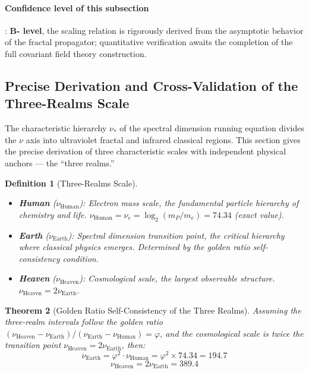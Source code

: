\documentclass[12pt,a4paper,twocolumn]{article}
\renewcommand{\phi}{\varphi}
\newtheorem{theorem}{Theorem}[section]
\newtheorem{definition}[theorem]{Definition}
\begin{document}
\paragraph{Confidence level of this subsection}: \textbf{B- level}, the scaling relation is rigorously derived from the asymptotic behavior of the fractal propagator; quantitative verification awaits the completion of the full covariant field theory construction.

\subsection{Precise Derivation and Cross-Validation of the Three-Realms Scale}
\label{subsec:three_realms}

The characteristic hierarchy $\nu_*$ of the spectral dimension running equation divides the $\nu$ axis into ultraviolet fractal and infrared classical regions. This section gives the precise derivation of three characteristic scales with independent physical anchors --- the ``three realms.''

\begin{definition}[Three-Realms Scale]
\begin{itemize}
\item \textbf{Human} ($\nu_{\text{Human}}$): Electron mass scale, the fundamental particle hierarchy of chemistry and life. $\nu_{\text{Human}} = \nu_e = \log_2(m_P/m_e) = 74.34$ (exact value).
\item \textbf{Earth} ($\nu_{\text{Earth}}$): Spectral dimension transition point, the critical hierarchy where classical physics emerges. Determined by the golden ratio self-consistency condition.
\item \textbf{Heaven} ($\nu_{\text{Heaven}}$): Cosmological scale, the largest observable structure. $\nu_{\text{Heaven}} = 2\nu_{\text{Earth}}$.
\end{itemize}
\end{definition}

\begin{theorem}[Golden Ratio Self-Consistency of the Three Realms]
\label{thm:three_realms}
Assuming the three-realm intervals follow the golden ratio $(\nu_{\text{Heaven}} - \nu_{\text{Earth}})/(\nu_{\text{Earth}} - \nu_{\text{Human}}) = \phi$, and the cosmological scale is twice the transition point $\nu_{\text{Heaven}} = 2\nu_{\text{Earth}}$, then:
\begin{equation}
\nu_{\text{Earth}} = \phi^2 \cdot \nu_{\text{Human}} = \phi^2 \times 74.34 = 194.7
\end{equation}
\begin{equation}
\nu_{\text{Heaven}} = 2\nu_{\text{Earth}} = 389.4
\end{equation}
\end{theorem}
\end{document}
